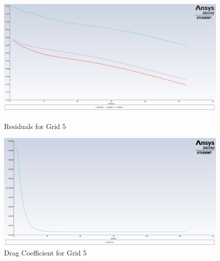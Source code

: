 \begin{figure}[H]
    \centering
    \begin{minipage}{0.45\textwidth}
        \centering
        \includegraphics[width=\textwidth]{Questions/Figures/residuals grid 5.png}
        \caption{Residuals for Grid 5}
        \label{fig:residuals_grid_5}
    \end{minipage}
    \begin{minipage}{0.45\textwidth}
        \centering
        \includegraphics[width=\textwidth]{Questions/Figures/drag force on square grid 5.png}
        \caption{Drag Coefficient for Grid 5}
        \label{fig:drag_coefficient_grid_5}
    \end{minipage}
\end{figure}
